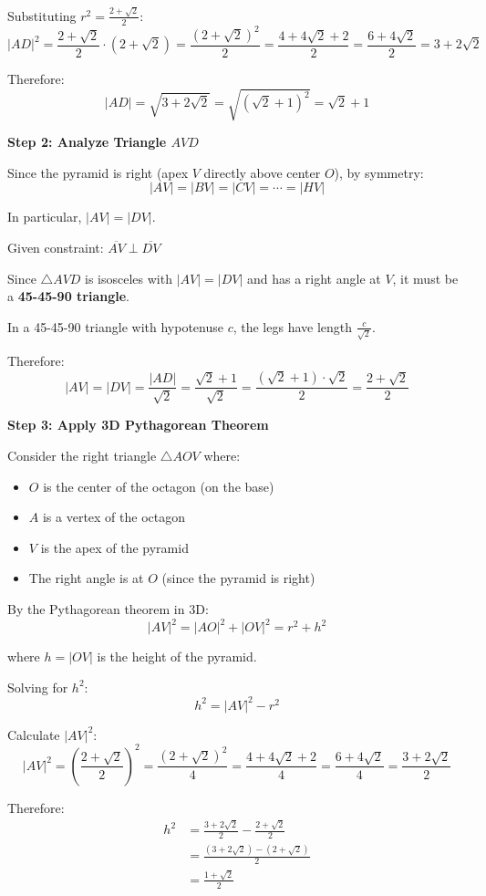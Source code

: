 \documentclass[12pt]{article}
\begin{document}
\begin{solutionbox}
Substituting $r^2 = \frac{2+\sqrt{2}}{2}$:
$$|AD|^2 = \frac{2+\sqrt{2}}{2} \cdot (2+\sqrt{2}) = \frac{(2+\sqrt{2})^2}{2} = \frac{4 + 4\sqrt{2} + 2}{2} = \frac{6+4\sqrt{2}}{2} = 3 + 2\sqrt{2}$$

Therefore:
$$|AD| = \sqrt{3+2\sqrt{2}} = \sqrt{(\sqrt{2}+1)^2} = \sqrt{2} + 1$$

\textbf{Step 2: Analyze Triangle $AVD$}

Since the pyramid is right (apex $V$ directly above center $O$), by symmetry:
$$|AV| = |BV| = |CV| = \cdots = |HV|$$

In particular, $|AV| = |DV|$.

Given constraint: $\overline{AV} \perp \overline{DV}$

Since $\triangle AVD$ is isosceles with $|AV| = |DV|$ and has a right angle at $V$, it must be a \textbf{45-45-90 triangle}.

In a 45-45-90 triangle with hypotenuse $c$, the legs have length $\frac{c}{\sqrt{2}}$.

Therefore:
$$|AV| = |DV| = \frac{|AD|}{\sqrt{2}} = \frac{\sqrt{2}+1}{\sqrt{2}} = \frac{(\sqrt{2}+1) \cdot \sqrt{2}}{2} = \frac{2 + \sqrt{2}}{2}$$

\textbf{Step 3: Apply 3D Pythagorean Theorem}

Consider the right triangle $\triangle AOV$ where:
\begin{itemize}
    \item $O$ is the center of the octagon (on the base)
    \item $A$ is a vertex of the octagon
    \item $V$ is the apex of the pyramid
    \item The right angle is at $O$ (since the pyramid is right)
\end{itemize}

By the Pythagorean theorem in 3D:
$$|AV|^2 = |AO|^2 + |OV|^2 = r^2 + h^2$$

where $h = |OV|$ is the height of the pyramid.

Solving for $h^2$:
$$h^2 = |AV|^2 - r^2$$

Calculate $|AV|^2$:
$$|AV|^2 = \left(\frac{2+\sqrt{2}}{2}\right)^2 = \frac{(2+\sqrt{2})^2}{4} = \frac{4 + 4\sqrt{2} + 2}{4} = \frac{6+4\sqrt{2}}{4} = \frac{3+2\sqrt{2}}{2}$$

Therefore:
\begin{align*}
h^2 &= \frac{3+2\sqrt{2}}{2} - \frac{2+\sqrt{2}}{2} \\
&= \frac{(3+2\sqrt{2}) - (2+\sqrt{2})}{2} \\
&= \frac{1 + \sqrt{2}}{2}
\end{align*}


\end{solutionbox}
\end{document}
